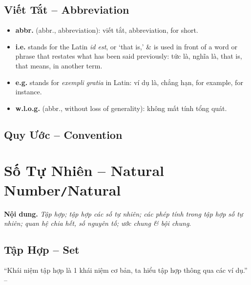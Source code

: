 \documentclass{article}
\numberwithin{equation}{section}
\begin{document}
\subsection*{Viết Tắt -- Abbreviation}
\begin{itemize}
	\item \textbf{abbr.} (abbr., abbreviation): viết tắt, abbreviation, for short.
	\item \textbf{i.e.} stands for the Latin \textit{id est}, or `that is,' \& is used in front of a word or phrase that restates what has been said previously: tức là, nghĩa là, that is, that means, in another term.
	\item \textbf{e.g.} stands for \textit{exempli gratia} in Latin: ví dụ là, chẳng hạn, for example, for instance.
	\item \textbf{w.l.o.g.} (abbr., without loss of generality): không mất tính tổng quát.
\end{itemize}


\subsection*{Quy Ước -- Convention}


\section{Số Tự Nhiên -- Natural Number\texttt{/}Natural}
\textbf{Nội dung.} \textit{Tập hợp; tập hợp các số tự nhiên; các phép tính trong tập hợp số tự nhiên; quan hệ chia hết, số nguyên tố; ước chung \textit{\&} bội chung}.

\subsection{Tập Hợp -- Set}
``Khái niệm tập hợp là 1 khái niệm cơ bản, ta hiểu tập hợp thông qua các ví dụ.'' -- \cite[p. 4]{Binh_Toan_6_tap_1}
\end{document}
